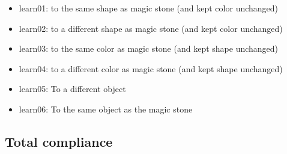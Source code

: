 \documentclass{article}
\begin{document}
\begin{itemize}
\item learn01: to the same shape as magic stone (and kept color unchanged)
\item learn02: to a different shape as magic stone (and kept color unchanged)
\item learn03: to the same color as magic stone (and kept shape unchanged)
\item learn04: to a different color as magic stone (and kept shape unchanged)
\item learn05: To a different object
\item learn06: To the same object as the magic stone
\end{itemize}

\subsection{Total compliance}
\end{document}
